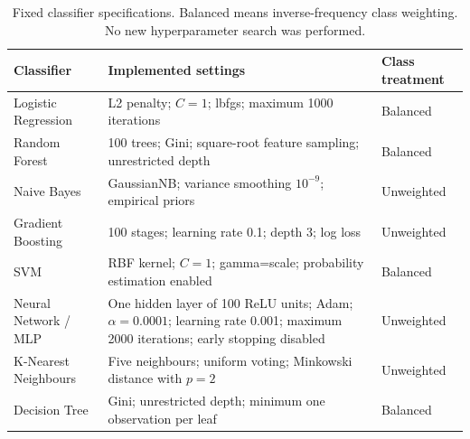 \begin{table}[t]
\centering\small
\caption{Fixed classifier specifications. Balanced means inverse-frequency class weighting. No new hyperparameter search was performed.}\label{tab:specs}
\begin{tabularx}{\textwidth}{lXl}
\toprule
Classifier & Implemented settings & Class treatment \\
\midrule
Logistic Regression & L2 penalty; $C=1$; lbfgs; maximum 1000 iterations & Balanced \\
Random Forest & 100 trees; Gini; square-root feature sampling; unrestricted depth & Balanced \\
Naive Bayes & GaussianNB; variance smoothing $10^{-9}$; empirical priors & Unweighted \\
Gradient Boosting & 100 stages; learning rate 0.1; depth 3; log loss & Unweighted \\
SVM & RBF kernel; $C=1$; gamma=scale; probability estimation enabled & Balanced \\
Neural Network / MLP & One hidden layer of 100 ReLU units; Adam; $\alpha=0.0001$; learning rate 0.001; maximum 2000 iterations; early stopping disabled & Unweighted \\
K-Nearest Neighbours & Five neighbours; uniform voting; Minkowski distance with $p=2$ & Unweighted \\
Decision Tree & Gini; unrestricted depth; minimum one observation per leaf & Balanced \\
\bottomrule
\end{tabularx}
\end{table}
